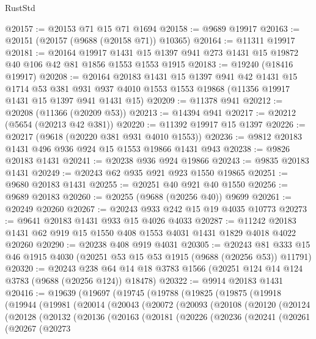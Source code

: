 \begin{lexlean}{RustStd}
\begin{coremodule}
@20157 := @20153 @71 @15 @71 @1694
@20158 := @9689 @19917
@20163 := @20151 (@20157 (@9688 (@20158 @71)) @10365)
@20164 := @11311 @19917
@20181 := @20164
    @19917
    @1431
    @15
    @1397
    @941
    @273
    @1431
    @15
    @19872
    @40
    @106
    @42
    @81
    @1856
    @1553
    @1553
    @1915
@20183 := @19240 (@18416 @19917)
@20208 := @20164
    @20183
    @1431
    @15
    @1397
    @941
    @42
    @1431
    @15
    @1714
    @53
    @381
    @931
    @937
    @4010
    @1553
    @1553
    @19868
    (@11356 @19917 @1431 @15 @1397 @941 @1431 @15)
@20209 := @11378 @941
@20212 := @20208 (@11366 (@20209 @53))
@20213 := @14394 @941
@20217 := @20212 (@5654 (@20213 @42 @381))
@20220 := @11392 @19917 @15 @1397
@20226 := @20217 (@9618 (@20220 @381 @931 @4010 @1553))
@20236 := @9812 @20183 @1431 @496 @936 @924 @15 @1553 @19866 @1431 @943
@20238 := @9826 @20183 @1431
@20241 := @20238 @936 @924 @19866
@20243 := @9835 @20183 @1431
@20249 := @20243 @62 @935 @921 @923 @1550 @19865
@20251 := @9680 @20183 @1431
@20255 := @20251 @40 @921 @40 @1550
@20256 := @9689 @20183
@20260 := @20255 (@9688 (@20256 @40)) @9699
@20261 := @20249 @20260
@20267 := @20243 @933 @242 @15 @19 @4035 @10773
@20273 := @9641 @20183 @1431 @933 @15 @4026 @4033
@20287 := @11242 @20183 @1431 @62 @919 @15 @1550 @408 @1553 @4031 @1431 @1829 @4018 @4022 @20260
@20290 := @20238 @408 @919 @4031
@20305 := @20243 @81 @333 @15 @46 @1915 @4030 (@20251 @53 @15 @53 @1915 (@9688 (@20256 @53)) @11791)
@20320 := @20243
    @238
    @64
    @14
    @18
    @3783
    @1566
    (@20251 @124 @14 @124 @3783 (@9688 (@20256 @124)) @18478)
@20322 := @9914 @20183 @1431
@20416 := @19639
    (@19697
      (@19745
        (@19788
          (@19825
            (@19875
              (@19918
                (@19944
                  (@19981
                    (@20014
                      (@20043
                        (@20072
                          (@20093
                            (@20108
                              (@20120
                                (@20124
                                  (@20128
                                    (@20132
                                      (@20136
                                        (@20163
                                          (@20181
                                            (@20226
                                              (@20236
                                                (@20241
                                                  (@20261
                                                    (@20267
                                                      (@20273

\end{coremodule}
\end{lexlean}
